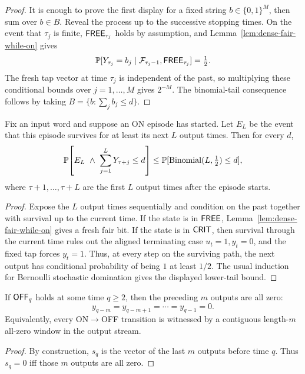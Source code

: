 \begin{proof}
It is enough to prove the first display for a fixed string \(b\in\{0,1\}^M\), then sum over \(b\in B\).
Reveal the process up to the successive stopping times. On the event that \(\tau_j\) is finite, \(\mathsf{FREE}_{\tau_j}\)
holds by assumption, and Lemma~\ref{lem:dense-fair-while-on} gives
\[
\mathbb{P}[Y_{\tau_j}=b_j\mid \mathcal{F}_{\tau_j-1},\mathsf{FREE}_{\tau_j}]=\tfrac12.
\]
The fresh tap vector at time \(\tau_j\) is independent of the past, so multiplying these conditional bounds over
\(j=1,\dots,M\) gives \(2^{-M}\). The binomial-tail consequence follows by taking
\(B=\{b:\sum_j b_j\le d\}\).
\end{proof}

\begin{lemma}
\label{lem:fixedtap-surviving-episode-tail}
Fix an input word and suppose an ON episode has started. Let \(E_L\) be the event that this episode survives for at
least its next \(L\) output times. Then for every \(d\),
\[
\mathbb{P}\!\left[
E_L\ \wedge\ \sum_{j=1}^L Y_{\tau+j}\le d
\right]
\le
\mathbb{P}[\operatorname{Binomial}(L,\tfrac12)\le d],
\]
where \(\tau+1,\dots,\tau+L\) are the first \(L\) output times after the episode starts.
\end{lemma}

\begin{proof}
Expose the \(L\) output times sequentially and condition on the past together with survival up to the current time.
If the state is in \(\mathsf{FREE}\), Lemma~\ref{lem:dense-fair-while-on} gives a fresh fair bit. If the state is in
\(\mathsf{CRIT}\), then survival through the current time rules out the aligned terminating case \(u_t=1,y_t=0\), and the
fixed tap forces \(y_t=1\). Thus, at every step on the surviving path, the next output has conditional probability of
being \(1\) at least \(1/2\). The usual induction for Bernoulli stochastic domination gives the displayed lower-tail
bound.
\end{proof}

\begin{lemma}
\label{lem:dense-off-requires-mzeros}
If $\mathsf{OFF}_q$ holds at some time $q\ge 2$, then the preceding $m$ outputs are all zero:
\[
y_{q-m}=y_{q-m+1}=\cdots=y_{q-1}=0.
\]
Equivalently, every ON$\to$OFF transition is witnessed by a contiguous length-$m$ all-zero window in the output stream.
\end{lemma}

\begin{proof}
By construction, $s_q$ is the vector of the last $m$ outputs before time $q$. Thus $s_q=0$ iff those $m$ outputs are all zero.
\end{proof}

